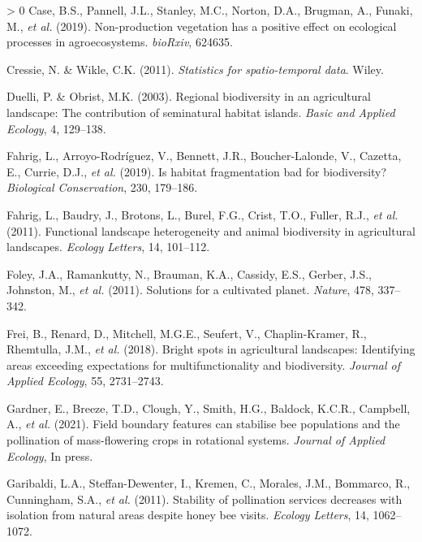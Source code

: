 \documentclass[]{elsarticle} %
\newlength{\cslhangindent}
\newenvironment{CSLReferences}[3] %
 {%
  \setlength{\parindent}{0pt}
  \ifodd #1 \everypar{\setlength{\hangindent}{\cslhangindent}}\ignorespaces\fi
  \ifnum #2 > 0
  \setlength{\parskip}{#2\baselineskip}
  \fi
 }%
 {}
\begin{document}
\begin{CSLReferences}{1}{0}
\leavevmode\hypertarget{ref-case2019}{}%
Case, B.S., Pannell, J.L., Stanley, M.C., Norton, D.A., Brugman, A., Funaki, M., \emph{et al.} (2019). Non-production vegetation has a positive effect on ecological processes in agroecosystems. \emph{bioRxiv}, 624635.

\leavevmode\hypertarget{ref-cressie2011}{}%
Cressie, N. \& Wikle, C.K. (2011). \emph{Statistics for spatio-temporal data}. Wiley.

\leavevmode\hypertarget{ref-duelli2003}{}%
Duelli, P. \& Obrist, M.K. (2003). Regional biodiversity in an agricultural landscape: The contribution of seminatural habitat islands. \emph{Basic and Applied Ecology}, 4, 129--138.

\leavevmode\hypertarget{ref-fahrig2019}{}%
Fahrig, L., Arroyo-Rodríguez, V., Bennett, J.R., Boucher-Lalonde, V., Cazetta, E., Currie, D.J., \emph{et al.} (2019). Is habitat fragmentation bad for biodiversity? \emph{Biological Conservation}, 230, 179--186.

\leavevmode\hypertarget{ref-fahrig2011}{}%
Fahrig, L., Baudry, J., Brotons, L., Burel, F.G., Crist, T.O., Fuller, R.J., \emph{et al.} (2011). Functional landscape heterogeneity and animal biodiversity in agricultural landscapes. \emph{Ecology Letters}, 14, 101--112.

\leavevmode\hypertarget{ref-foley2011}{}%
Foley, J.A., Ramankutty, N., Brauman, K.A., Cassidy, E.S., Gerber, J.S., Johnston, M., \emph{et al.} (2011). Solutions for a cultivated planet. \emph{Nature}, 478, 337--342.

\leavevmode\hypertarget{ref-frei2018}{}%
Frei, B., Renard, D., Mitchell, M.G.E., Seufert, V., Chaplin-Kramer, R., Rhemtulla, J.M., \emph{et al.} (2018). Bright spots in agricultural landscapes: Identifying areas exceeding expectations for multifunctionality and biodiversity. \emph{Journal of Applied Ecology}, 55, 2731--2743.

\leavevmode\hypertarget{ref-gardner2021}{}%
Gardner, E., Breeze, T.D., Clough, Y., Smith, H.G., Baldock, K.C.R., Campbell, A., \emph{et al.} (2021). Field boundary features can stabilise bee populations and the pollination of mass-flowering crops in rotational systems. \emph{Journal of Applied Ecology}, In press.

\leavevmode\hypertarget{ref-garibaldi2011}{}%
Garibaldi, L.A., Steffan-Dewenter, I., Kremen, C., Morales, J.M., Bommarco, R., Cunningham, S.A., \emph{et al.} (2011). Stability of pollination services decreases with isolation from natural areas despite honey bee visits. \emph{Ecology Letters}, 14, 1062--1072.


\end{CSLReferences}
\end{document}
